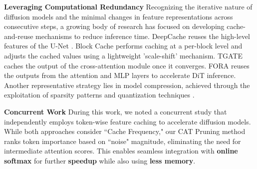 \textbf{Leveraging Computational Redundancy} %
Recognizing the iterative nature of diffusion models and the minimal changes in feature representations across consecutive steps, a growing body of research has focused on developing cache-and-reuse mechanisms to reduce inference time. DeepCache \citep{ma2023deepcache} reuses the high-level features of the U-Net \citep{ronneberger2015unetconvolutionalnetworksbiomedical}. Block Cache \citep{wimbauer2023cache} performs caching at a per-block level and adjusts the cached values using a lightweight 'scale-shift' mechanism. TGATE \citep{liu2024faster,tgate} caches the output of the cross-attention module once it converges. FORA \citep{Selvaraju2024FORAFC} reuses the outputs from the attention and MLP layers to accelerate DiT inference. Another representative strategy lies in model compression, achieved through the exploitation of sparsity patterns \citep{NEURIPS2022_b9603de9,wang2024sparsedmsparseefficientdiffusion} and quantization techniques \citep{zhao2024viditqefficientaccuratequantization,fang2023structuralpruningdiffusionmodels,li2023qdiffusionquantizingdiffusionmodels}.

\textbf{Concurrent Work}
During this work, we noted a concurrent study \citep{zou2024acceleratingdiffusiontransformerstokenwise} that independently employs token-wise feature caching to accelerate diffusion models. While both approaches consider ``Cache Frequency," our CAT Pruning method ranks token importance based on ``noise" magnitude, eliminating the need for intermediate attention scores. This enables seamless integration with \textbf{online softmax} \citep{milakov2018onlinenormalizercalculationsoftmax, NEURIPS2022_67d57c32} for further \textbf{speedup} while also using \textbf{less memory}.